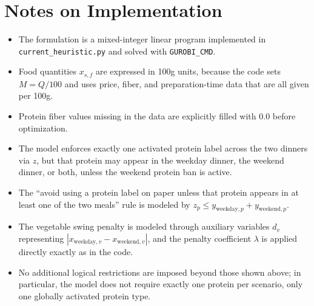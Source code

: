 \section*{Notes on Implementation}

\begin{itemize}
    \item The formulation is a mixed-integer linear program implemented in \texttt{current\_heuristic.py} and solved with \texttt{GUROBI\_CMD}.
    \item Food quantities \(x_{s,f}\) are expressed in 100g units, because the code sets \(M=Q/100\) and uses price, fiber, and preparation-time data that are all given per 100g.
    \item Protein fiber values missing in the data are explicitly filled with \(0.0\) before optimization.
    \item The model enforces exactly one activated protein label across the two dinners via \(z\), but that protein may appear in the weekday dinner, the weekend dinner, or both, unless the weekend protein ban is active.
    \item The ``avoid using a protein label on paper unless that protein appears in at least one of the two meals'' rule is modeled by \(z_p \le y_{\text{weekday},p}+y_{\text{weekend},p}\).
    \item The vegetable swing penalty is modeled through auxiliary variables \(d_v\) representing \(|x_{\text{weekday},v}-x_{\text{weekend},v}|\), and the penalty coefficient \(\lambda\) is applied directly exactly as in the code.
    \item No additional logical restrictions are imposed beyond those shown above; in particular, the model does not require exactly one protein per scenario, only one globally activated protein type.
\end{itemize}
